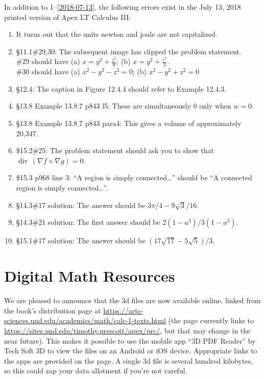 \documentclass{amsart}
\makeatletter
\newcommand{\ds}{\displaystyle}
\DeclareMathOperator{\divv}{div}
\newcommand{\reforzero}[1]{%
 \@ifundefined{r@#1}{0}{\ref{#1}}%
}
\makeatother
\begin{document}
In addition to 1--\ref{2018-07-13}, the following errors exist in the July 13, 2018 printed version of Apex LT Calculus III:
\begin{enumerate}\setcounter{enumi}{\reforzero{2018-07-13}}
\item It turns out that the units newton and joule are not capitalized.
\item \S11.1\#29,30: The subsequent image has clipped the problem statement.\\
 \#29 should have (a) $\ds x=y^2+\frac{z^2}{9}$; (b) $\ds x=y^2+\frac{z^2}{3}$.\\
 \#30 should have (a) $\ds x^2-y^2-z^2=0$; (b) $x^2-y^2+z^2=0$
\item \S12.4: The caption in Figure 12.4.4 should refer to Example 12.4.3.
\item \S13.8 Example 13.8.7 p843 l5: These are simultaneously 0 only when $w=0$.
\item \S13.8 Example 13.8.7 p843 para4: This gives a volume of approximately 20{,}347.
\item \$15.2\#25: The problem statement should ask you to show that $\divv\,(\nabla f\times\nabla g) = 0$.
\item \$15.3 p968 line 3: ``A region is simply connected\ldots'' should be ``A connected region is simply connected\ldots''.
\item \S14.3\#17 solution: The answer should be $3\pi/4-9\sqrt3/16$.
\item \S14.3\#21 solution: The first answer should be $2(1-a^3)/3(1-a^2)$.
\item \S15.1\#17 solution: The answer should be $(17\sqrt{17} - 5\sqrt{5})/3$.
\label{2018-07-13IIIplus}
\end{enumerate}

\section*{Digital Math Resources}

We are pleased to announce that the 3d files are now available online, linked from the book's distribution page at \url{https://arts-sciences.und.edu/academics/math/calc-1-texts.html} (the page currently links to \url{https://sites.und.edu/timothy.prescott/apex/prc/}, but that may change in the near future).  This makes it possible to use the mobile app ``3D PDF Reader'' by Tech Soft 3D to view the files on an Android or iOS device.  Appropriate links to the apps are provided on the page.  A single 3d file is several hundred kilobytes, so this could zap your data allotment if you're not careful.
\end{document}
